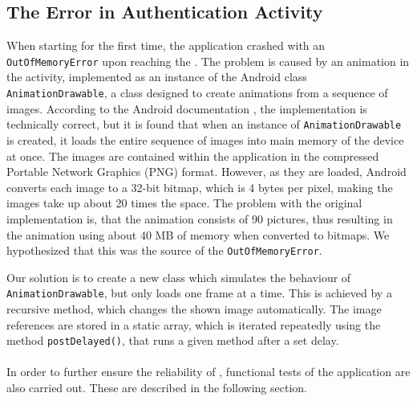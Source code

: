 \subsection{The Error in Authentication Activity}
When starting \launcher for the first time, the application crashed with an \lstinline{OutOfMemoryError} upon reaching the \authenticationactivity.
The problem is caused by an animation in the activity, implemented as an instance of the Android class \lstinline{AnimationDrawable}, a class designed to create animations from a sequence of images.
According to the Android documentation \citet{androidreference}, the implementation is technically correct, but it is found that when an instance of \lstinline{AnimationDrawable} is created, it loads the entire sequence of images into main memory of the device at once.
The images are contained within the application in the compressed Portable Network Graphics (PNG) format.
However, as they are loaded, Android converts each image to a 32-bit bitmap, which is 4 bytes per pixel, making the images take up about 20 times the space.
The problem with the original implementation is, that the animation consists of 90 pictures, thus resulting in the animation using about 40 MB of memory when converted to bitmaps. 
We hypothesized that this was the source of the \lstinline{OutOfMemoryError}.

Our solution is to create a new class which simulates the behaviour of \lstinline{AnimationDrawable}, but only loads one frame at a time.
This is achieved by a recursive method, which changes the shown image automatically.
The image references are stored in a static array, which is iterated repeatedly using the method \lstinline|postDelayed()|, that runs a given method after a set delay.\\\\

In order to further ensure the reliability of \launcher, functional tests of the application are also carried out.
These are described in the following section.